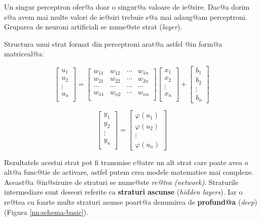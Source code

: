 Un singur perceptron ofer@a doar o singur@a valoare de ie@sire. Dac@a dorim s@a avem mai multe valori de ie@siri trebuie s@a mai adaug@am perceptroni. Gruparea de neuroni artificiali se nume@ste strat ({\sl layer}).

Structura unui strat format din perceptroni arat@a astfel @in form@a matriceal@a:

$$
	\begin{bmatrix}
		u_1 \\
		u_2 \\
		\vdots \\ 
		u_n \\
	\end{bmatrix}	
	= 
	\begin{bmatrix}
		w_{11} & w_{12} & \cdots & w_{1n} \\
		w_{21} & w_{22} & \cdots & w_{2n} \\
		\cdots & \cdots & \cdots & \cdots \\
		w_{n1} & w_{n2} & \cdots & w_{nn} \\
	\end{bmatrix}
	\begin{bmatrix}
		x_1 \\
		x_2 \\
		\vdots \\
		x_n \\
	\end{bmatrix}
	+
	\begin{bmatrix}
		b_1 \\
		b_2 \\
		\vdots \\
		b_n
	\end{bmatrix}
$$

$$
\begin{bmatrix}
		y_1 \\
		y_2 \\
		\vdots \\ 
		y_n \\
	\end{bmatrix}	
	=
	\begin{bmatrix}
		\varphi (u_1)\\
		\varphi	(u_2) \\
		\vdots \\
		\varphi (u_n)
	\end{bmatrix}
$$

Rezultatele acestui strat pot fi transmise c@atre un alt strat care poate avea o alt@a func@tie de activare, astfel putem crea modele matematice mai complexe. Aceast@a @in@siruire de straturi se nume@ste {\sl re@tea (network)}. Straturile intermediare sunt deseori referite ca \textbf{straturi ascunse} (\textsl{hidden layers}). Iar o re@tea cu foarte multe straturi asunse poart@a denumirea de \textbf{profund@a} (\textsl{deep}) (Figura \ref{nn:schema-basic}).

